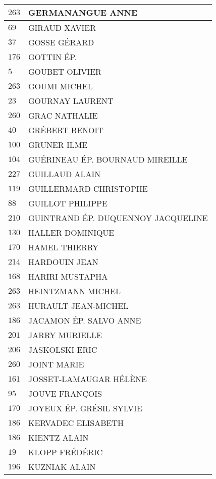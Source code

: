 \begin{xltabular}{\linewidth}{|l|X|}
    $263$ & GERMANANGUE ANNE \\
    \hline
    $69$ & GIRAUD XAVIER \\
    \hline
    $37$ & GOSSE GÉRARD \\
    \hline
    $176$ & GOTTIN ÉP. \\
    \hline
    $5$ & GOUBET OLIVIER \\
    \hline
    $263$ & GOUMI MICHEL \\
    \hline
    $23$ & GOURNAY LAURENT \\
    \hline
    $260$ & GRAC NATHALIE \\
    \hline
    $40$ & GRÉBERT BENOIT \\
    \hline
    $100$ & GRUNER ILME \\
    \hline
    $104$ & GUÉRINEAU ÉP. BOURNAUD MIREILLE \\
    \hline
    $227$ & GUILLAUD ALAIN \\
    \hline
    $119$ & GUILLERMARD CHRISTOPHE \\
    \hline
    $88$ & GUILLOT PHILIPPE \\
    \hline
    $210$ & GUINTRAND ÉP. DUQUENNOY JACQUELINE \\
    \hline
    $130$ & HALLER DOMINIQUE \\
    \hline
    $170$ & HAMEL THIERRY \\
    \hline
    $214$ & HARDOUIN JEAN \\
    \hline
    $168$ & HARIRI MUSTAPHA \\
    \hline
    $263$ & HEINTZMANN MICHEL \\
    \hline
    $263$ & HURAULT JEAN-MICHEL \\
    \hline
    $186$ & JACAMON ÉP. SALVO ANNE \\
    \hline
    $201$ & JARRY MURIELLE \\
    \hline
    $206$ & JASKOLSKI ERIC \\
    \hline
    $260$ & JOINT MARIE \\
    \hline
    $161$ & JOSSET-LAMAUGAR HÉLÈNE \\
    \hline
    $95$ & JOUVE FRANÇOIS \\
    \hline
    $170$ & JOYEUX ÉP. GRÉSIL SYLVIE \\
    \hline
    $186$ & KERVADEC ELISABETH \\
    \hline
    $186$ & KIENTZ ALAIN \\
    \hline
    $19$ & KLOPP FRÉDÉRIC \\
    \hline
    $196$ & KUZNIAK ALAIN \\

\end{xltabular}
